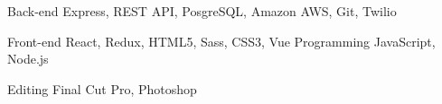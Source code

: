
\begin{cvskills}

    \cvskill
    {Back-end} %
    {Express, REST API, PosgreSQL, Amazon AWS, Git, Twilio}

\cvskill
    {Front-end} %
    {React, Redux, HTML5, Sass, CSS3, Vue}
\cvskill
    {Programming} %
    {JavaScript, Node.js}
    
\cvskill
    {Editing} %
    {Final Cut Pro, Photoshop}
    
\end{cvskills}